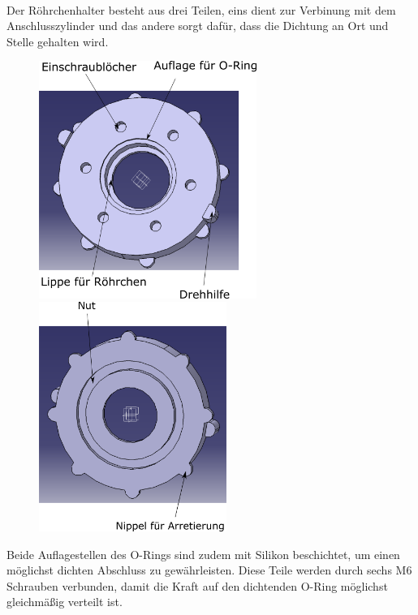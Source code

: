 \hfill \\

Der Röhrchenhalter besteht aus drei Teilen, eins dient zur Verbinung mit dem Anschlusszylinder und das andere sorgt dafür, dass die Dichtung an Ort und Stelle gehalten wird. 

\begin{figure}[h]
	\begin{minipage}[hbt]{7.1cm}
		\centering
		\includegraphics[width=7.1cm]{Halter_oben.png}
	\end{minipage}
	\hfill
	\begin{minipage}[hbt]{6.1cm}
		\centering
		\includegraphics[width=6.1cm]{Halter_unten.png}
	\end{minipage}
\end{figure}

Beide Auflagestellen des O-Rings sind zudem mit Silikon beschichtet, um einen möglichst dichten Abschluss zu gewährleisten.
Diese Teile werden durch sechs M6 Schrauben verbunden, damit die Kraft auf den dichtenden O-Ring möglichst gleichmäßig verteilt ist. \\

